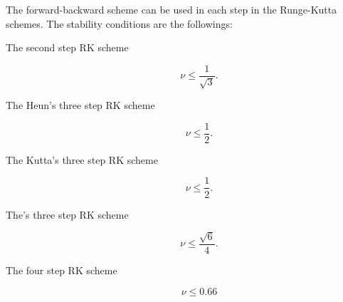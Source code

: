 The forward-backward scheme can be used in each step in the Runge-Kutta schemes.
The stability conditions are the followings:
\begin{description}
 \item[The second step RK scheme]
 \begin{equation}
   \nu \le \frac{1}{\sqrt{3}}.
 \end{equation}

 \item[The Heun's three step RK scheme]
 \begin{equation}
   \nu \le \frac{1}{2}.
 \end{equation}

 \item[The Kutta's three step RK scheme]
 \begin{equation}
   \nu \le \frac{1}{2}.
 \end{equation}

 \item[The\citet{Wicker_2002}'s three step RK scheme]
 \begin{equation}
   \nu \le \frac{\sqrt{6}}{4}.
 \end{equation}

 \item[The four step RK scheme]
 \begin{equation}
   \nu \le 0.66
 \end{equation}


\end{description}
